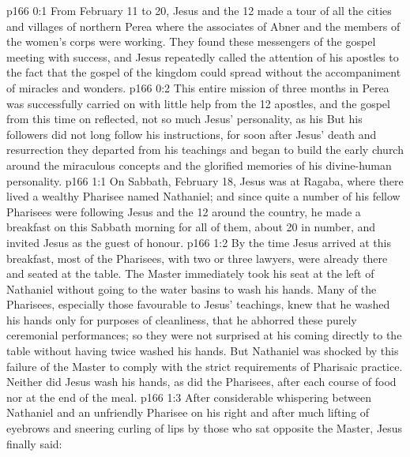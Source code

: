 \author{Midwayer Commission}
\vs p166 0:1 From February 11 to 20, Jesus and the 12 made a tour of all the cities and villages of northern Perea where the associates of Abner and the members of the women’s corps were working. They found these messengers of the gospel meeting with success, and Jesus repeatedly called the attention of his apostles to the fact that the gospel of the kingdom could spread without the accompaniment of miracles and wonders.
\vs p166 0:2 This entire mission of three months in Perea was successfully carried on with little help from the 12 apostles, and the gospel from this time on reflected, not so much Jesus’ personality, as his  But his followers did not long follow his instructions, for soon after Jesus’ death and resurrection they departed from his teachings and began to build the early church around the miraculous concepts and the glorified memories of his divine\hyp{}human personality.
\vs p166 1:1 On Sabbath, February 18, Jesus was at Ragaba, where there lived a wealthy Pharisee named Nathaniel; and since quite a number of his fellow Pharisees were following Jesus and the 12 around the country, he made a breakfast on this Sabbath morning for all of them, about 20 in number, and invited Jesus as the guest of honour.
\vs p166 1:2 By the time Jesus arrived at this breakfast, most of the Pharisees, with two or three lawyers, were already there and seated at the table. The Master immediately took his seat at the left of Nathaniel without going to the water basins to wash his hands. Many of the Pharisees, especially those favourable to Jesus’ teachings, knew that he washed his hands only for purposes of cleanliness, that he abhorred these purely ceremonial performances; so they were not surprised at his coming directly to the table without having twice washed his hands. But Nathaniel was shocked by this failure of the Master to comply with the strict requirements of Pharisaic practice. Neither did Jesus wash his hands, as did the Pharisees, after each course of food nor at the end of the meal.
\vs p166 1:3 After considerable whispering between Nathaniel and an unfriendly Pharisee on his right and after much lifting of eyebrows and sneering curling of lips by those who sat opposite the Master, Jesus finally said: 
